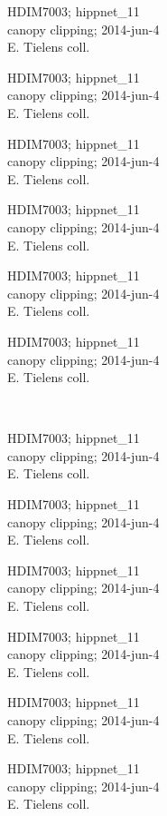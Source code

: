 \documentclass[2pt]{extarticle}
\begin{document}
\noindent
\parbox{0.16\textwidth}{\tiny \raggedright \rule[-0.3\baselineskip]{0pt}{10pt}HDIM7003; hippnet\_11\\ canopy clipping; 2014-jun-4\\ E. Tielens coll.}
\parbox{0.16\textwidth}{\tiny \raggedright \rule[-0.3\baselineskip]{0pt}{10pt}HDIM7003; hippnet\_11\\ canopy clipping; 2014-jun-4\\ E. Tielens coll.}
\parbox{0.16\textwidth}{\tiny \raggedright \rule[-0.3\baselineskip]{0pt}{10pt}HDIM7003; hippnet\_11\\ canopy clipping; 2014-jun-4\\ E. Tielens coll.}
\parbox{0.16\textwidth}{\tiny \raggedright \rule[-0.3\baselineskip]{0pt}{10pt}HDIM7003; hippnet\_11\\ canopy clipping; 2014-jun-4\\ E. Tielens coll.}
\parbox{0.16\textwidth}{\tiny \raggedright \rule[-0.3\baselineskip]{0pt}{10pt}HDIM7003; hippnet\_11\\ canopy clipping; 2014-jun-4\\ E. Tielens coll.}
\parbox{0.16\textwidth}{\tiny \raggedright \rule[-0.3\baselineskip]{0pt}{10pt}HDIM7003; hippnet\_11\\ canopy clipping; 2014-jun-4\\ E. Tielens coll.} \\ 
\vspace{0.001in} 

\noindent
\parbox{0.16\textwidth}{\tiny \raggedright \rule[-0.3\baselineskip]{0pt}{10pt}HDIM7003; hippnet\_11\\ canopy clipping; 2014-jun-4\\ E. Tielens coll.}
\parbox{0.16\textwidth}{\tiny \raggedright \rule[-0.3\baselineskip]{0pt}{10pt}HDIM7003; hippnet\_11\\ canopy clipping; 2014-jun-4\\ E. Tielens coll.}
\parbox{0.16\textwidth}{\tiny \raggedright \rule[-0.3\baselineskip]{0pt}{10pt}HDIM7003; hippnet\_11\\ canopy clipping; 2014-jun-4\\ E. Tielens coll.}
\parbox{0.16\textwidth}{\tiny \raggedright \rule[-0.3\baselineskip]{0pt}{10pt}HDIM7003; hippnet\_11\\ canopy clipping; 2014-jun-4\\ E. Tielens coll.}
\parbox{0.16\textwidth}{\tiny \raggedright \rule[-0.3\baselineskip]{0pt}{10pt}HDIM7003; hippnet\_11\\ canopy clipping; 2014-jun-4\\ E. Tielens coll.}
\parbox{0.16\textwidth}{\tiny \raggedright \rule[-0.3\baselineskip]{0pt}{10pt}HDIM7003; hippnet\_11\\ canopy clipping; 2014-jun-4\\ E. Tielens coll.} \\ 
\vspace{0.001in} 
\end{document}
